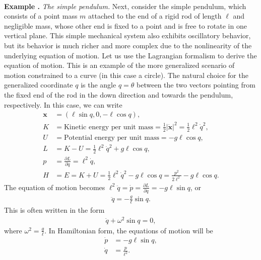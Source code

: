 \documentclass[12pt]{amsart}
\newcommand{\eq}[1]{\begin{equation}\begin{split}#1\end{split}\end{equation}}
\newcommand{\eqst}[1]{\begin{align*}#1\end{align*}}
\newcommand{\pder}[2]{\frac{\partial#1}{\partial#2}}
\newcounter{example}
\newcommand{\beginexample}[1]{\ \\ \addtocounter{example}{1} \textbf{Example \arabic{example}.} \textit{#1.}}
\begin{document}
\beginexample{The simple pendulum}
Next, consider the simple pendulum, which consists of a point mass $m$ attached to the end of a rigid rod of length $\ell$ and negligible mass, whose other end is fixed to a point and is free to rotate in one vertical plane. This simple mechanical system also exhibits oscillatory behavior, but its behavior is much richer and more complex due to the nonlinearity of the underlying equation of motion. Let us use the Lagrangian formalism to derive the equation of motion. This is an example of the more generalized scenario of motion constrained to a curve (in this case a circle). The natural choice for the generalized coordinate $q$ is the angle $q=\theta$ between the two vectors pointing from the fixed end of the rod in the down direction and towards the pendulum, respectively. In this case, we can write
\eqst{
\mathbf{x} &= (\ell\sin q, 0, -\ell \cos q), \\
K &= \textrm{Kinetic energy per unit mass} = \tfrac12|\dot{\mathbf{x}}|^2 = \tfrac12 \ell^2 \dot{q}^2, \\
U &= \textrm{Potential energy per unit mass} = -g\ell\cos q, \\
L &= K-U = \tfrac12 \ell^2 \dot{q}^2 + g \ell \cos q, \\
p &= \pder{L}{\dot{q}} = \ell^2 \dot{q}, \\
H &= E = K+U = \tfrac12 \ell^2 \dot{q}^2 - g \ell\cos q
= \frac{p^2}{2\ell^2} - g\ell\cos q.
}
The equation of motion becomes $\ell^2 \ddot{q}=\dot{p} = \pder{L}{q}=-g\ell \sin q$, or
\eqst{
\ddot{q} = -\frac{g}{\ell} \sin q.
}
This is often written in the form
\eq{ \label{eq:pendulumeq}
\ddot{q} + \omega^2 \sin q = 0,
}
where $\omega^2 = \frac{g}{\ell}$. In Hamiltonian form, the equations of motion will be
\eqst{ \dot{p}&= -g\ell \sin q, \\ \dot{q}&=\frac{p}{\ell^2}. }
\end{document}
